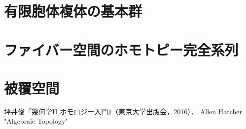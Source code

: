 \documentclass[uplatex,dvipdfmx]{jsreport}
\begin{document}
\section{有限胞体複体の基本群}

\section{ファイバー空間のホモトピー完全系列}

\section{被覆空間}

\begin{thebibliography}{9}
    坪井俊『幾何学II ホモロジー入門』（東京大学出版会，2016）．
    Allen Hatcher "Algebraic Topology" 
\end{thebibliography}
\end{document}

